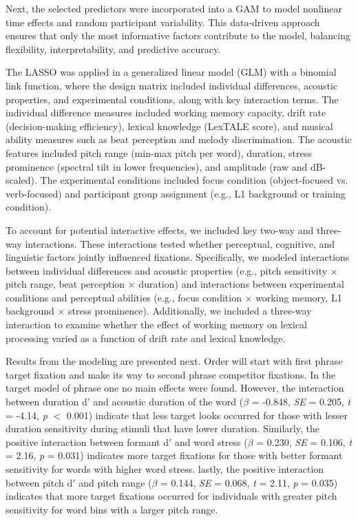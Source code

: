 Next, the selected predictors were incorporated into a GAM to model nonlinear time effects and random participant variability. This data-driven approach ensures that only the most informative factors contribute to the model, balancing flexibility, interpretability, and predictive accuracy.

The LASSO was applied in a generalized linear model (GLM) with a binomial link function, where the design matrix included individual differences, acoustic properties, and experimental conditions, along with key interaction terms. The individual difference measures included working memory capacity, drift rate (decision-making efficiency), lexical knowledge (LexTALE score), and musical ability measures such as beat perception and melody discrimination. The acoustic features included pitch range (min-max pitch per word), duration, stress prominence (spectral tilt in lower frequencies), and amplitude (raw and dB-scaled). The experimental conditions included focus condition (object-focused vs. verb-focused) and participant group assignment (e.g., L1 background or training condition).

To account for potential interactive effects, we included key two-way and three-way interactions. These interactions tested whether perceptual, cognitive, and linguistic factors jointly influenced fixations. Specifically, we modeled interactions between individual differences and acoustic properties (e.g., pitch sensitivity × pitch range, beat perception × duration) and interactions between experimental conditions and perceptual abilities (e.g., focus condition × working memory, L1 background × stress prominence). Additionally, we included a three-way interaction to examine whether the effect of working memory on lexical processing varied as a function of drift rate and lexical knowledge.

Results from the modeling are presented next. Order will start with first phrase target fixation and make its way to second phrase competitor fixations. In the target model of phrase one no main effects were found. However, the interaction between duration d' and acoustic duration of the word ($\beta$ = -0.848, \textit{SE} = 0.205, \textit{t} = -4.14, \textit{p} $<$ 0.001) indicate that less target looks occurred for those with lesser duration sensitivity during stimuli that have lower duration. Similarly, the positive interaction between formant d$'$ and word stress ($\beta$ = 0.230, \textit{SE} = 0.106, \textit{t} = 2.16, \textit{p} = 0.031) indicates more target fixations for those with better formant sensitivity for words with higher word stress. lastly, the positive interaction between pitch d$'$ and pitch range ($\beta$ = 0.144, \textit{SE} = 0.068, \textit{t} = 2.11, \textit{p} = 0.035) indicates that more target fixations occurred for individuals with greater pitch sensitivity for word bins with a larger pitch range.

